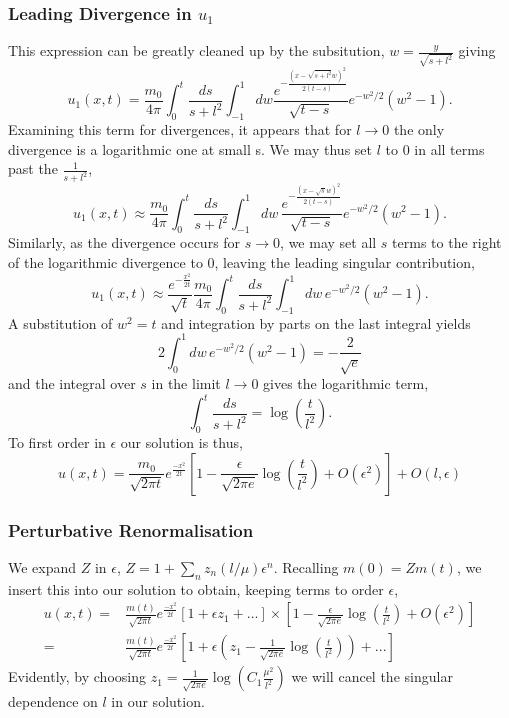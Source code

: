 \subsubsection{Leading Divergence in $u_1$}

This expression can be greatly cleaned up by the subsitution, $w = \frac{y}{\sqrt{s+l^2}}$ giving
\[u_1(x, t) = \frac{m_0}{4\pi}\int_0^t \frac{ds}{s+l^2} \int_{-1}^{1} dw
\frac{e^{-\frac{(x-\sqrt{s+l^2}w)^2}{2(t-s)}}}{\sqrt{t-s}}e^{-w^2/2}
\left(w^2 - 1\right). \]
Examining this term for divergences, it appears that for $l\to 0$ the only divergence is a
logarithmic one at small s.  We may thus set $l$ to 0 in all terms past the $\frac{1}{s+l^2}$,
\[u_1(x, t) \approx \frac{m_0}{4\pi}\int_0^t \frac{ds}{s+l^2} \int_{-1}^{1} dw\,
\frac{e^{-\frac{(x-\sqrt{s}w)^2}{2(t-s)}}}{\sqrt{t-s}}e^{-w^2/2}
\left(w^2 - 1\right). \]
Similarly, as the divergence occurs for $s\to 0$, we may set all $s$ terms to the right of the
logarithmic divergence to 0, leaving the leading singular contribution,
\[u_1(x, t) \approx \frac{e^{-\frac{x^2}{2t}}}{\sqrt{t}}\frac{m_0}{4\pi}\int_0^t \frac{ds}{s+l^2} \int_{-1}^{1} dw\,
e^{-w^2/2}\left(w^2 - 1\right). \]
A substitution of $w^2 = t$ and integration by parts on the last integral yields
\[2\int_{0}^{1} dw\,e^{-w^2/2}\left(w^2 - 1\right) = -\frac{2}{\sqrt{e}} \]
and the integral over $s$ in the limit $l\to 0$ gives the logarithmic term,
\[\int_0^t \frac{ds}{s+l^2} = \log\left(\frac{t}{l^2}\right). \]
To first order in $\epsilon$ our solution is thus,
\[u(x, t)  = \frac{m_0}{\sqrt{2\pi t}} e^{\frac{-x^2}{2t}} \left[1 - 
\frac{\epsilon}{\sqrt{2\pi e}}\log\left(\frac{t}{l^2}\right) + O(\epsilon^2) \right] + O(l,\epsilon)\]

\subsubsection{Perturbative Renormalisation}
We expand $Z$ in $\epsilon$, $Z = 1 + \sum_n z_n(l/\mu) \epsilon^n$.  Recalling $m(0) = Zm(t)$,
we insert this into our solution to obtain, keeping terms to order $\epsilon$,
\begin{align*}
u(x, t) =& \frac{m(t)}{\sqrt{2\pi t}} e^{\frac{-x^2}{2t}} \left[1 + \epsilon z_1 +...\right]
\times \left[ 1  - \frac{\epsilon}{\sqrt{2\pi e}}\log\left(\frac{t}{l^2}\right) + O(\epsilon^2) \right] \\
=&\frac{m(t)}{\sqrt{2\pi t}} e^{\frac{-x^2}{2t}} \left[ 1 + \epsilon 
\left(z_1 - \frac{1}{\sqrt{2\pi e}} \log \left(\frac{t}{l^2}\right)\right) + ... \right]
\end{align*}
Evidently, by choosing $z_1 = \frac{1}{\sqrt{2\pi e}} \log \left(C_1 \frac{\mu^2}{l^2}\right)$ we
will cancel the singular dependence on $l$ in our solution.

